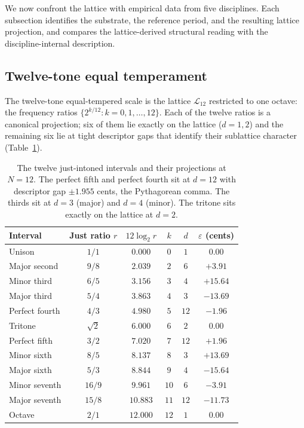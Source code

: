\documentclass[11pt,a4paper]{article}
\theoremstyle{definition}
\theoremstyle{remark}
\newcommand{\eps}{\varepsilon}
\begin{document}
We now confront the lattice with empirical data from five disciplines. Each subsection identifies the substrate, the reference period, and the resulting lattice projection, and compares the lattice-derived structural reading with the discipline-internal description.

\subsection{Twelve-tone equal temperament}\label{subsec:temperament}

The twelve-tone equal-tempered scale is the lattice $\mathcal{L}_{12}$ restricted to one octave: the frequency ratios $\{2^{k/12} : k=0,1,\ldots,12\}$. Each of the twelve ratios is a canonical projection; six of them lie exactly on the lattice ($d=1,2$) and the remaining six lie at tight descriptor gaps that identify their sublattice character (Table~\ref{tab:intervals}).

\begin{table}[h]
\centering
\begin{tabular}{@{}l c c c c c@{}}
\toprule
Interval & Just ratio $r$ & $12\log_{2}r$ & $k$ & $d$ & $\eps$ (cents)\\
\midrule
Unison & $1/1$ & $0.000$ & $0$ & $1$ & $0.00$\\
Major second & $9/8$ & $2.039$ & $2$ & $6$ & $+3.91$\\
Minor third & $6/5$ & $3.156$ & $3$ & $4$ & $+15.64$\\
Major third & $5/4$ & $3.863$ & $4$ & $3$ & $-13.69$\\
Perfect fourth & $4/3$ & $4.980$ & $5$ & $12$ & $-1.96$\\
Tritone & $\sqrt{2}$ & $6.000$ & $6$ & $2$ & $0.00$\\
Perfect fifth & $3/2$ & $7.020$ & $7$ & $12$ & $+1.96$\\
Minor sixth & $8/5$ & $8.137$ & $8$ & $3$ & $+13.69$\\
Major sixth & $5/3$ & $8.844$ & $9$ & $4$ & $-15.64$\\
Minor seventh & $16/9$ & $9.961$ & $10$ & $6$ & $-3.91$\\
Major seventh & $15/8$ & $10.883$ & $11$ & $12$ & $-11.73$\\
Octave & $2/1$ & $12.000$ & $12$ & $1$ & $0.00$\\
\bottomrule
\end{tabular}
\caption{The twelve just-intoned intervals and their projections at $N=12$. The perfect fifth and perfect fourth sit at $d=12$ with descriptor gap $\pm 1.955$ cents, the Pythagorean comma. The thirds sit at $d=3$ (major) and $d=4$ (minor). The tritone sits exactly on the lattice at $d=2$.}
\label{tab:intervals}
\end{table}
\end{document}
